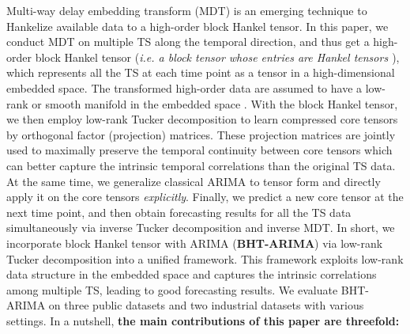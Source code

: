 \documentclass[letterpaper]{article} %
\numberwithin{theorem}{section}
\begin{document}
	
	Multi-way delay embedding transform (MDT)  \cite{yokota2018missing}  is an emerging technique to Hankelize  available data to a high-order block Hankel tensor. In this paper, we conduct MDT on multiple  TS along the temporal direction, and thus get a  high-order block Hankel tensor   (\textit{i.e. a block tensor whose entries are Hankel  tensors \cite{ding2015fast}}),  which represents all the  TS at each time point    as a tensor  in a high-dimensional embedded space. The transformed  high-order data are assumed to have   a low-rank  or  smooth manifold  in the embedded space \cite{yokota2018missing,yokota2018tensor}.
	With the block Hankel tensor, we then employ low-rank Tucker decomposition  to  learn  compressed core tensors by    orthogonal factor (projection) matrices.  These  projection matrices  are jointly used  to maximally preserve the temporal continuity between core tensors which can better capture the intrinsic  temporal correlations than the original TS data. 
	At the same time,  we generalize classical ARIMA to tensor form and directly apply it on the core tensors \textit{explicitly}.  Finally, we predict a new core tensor at the next time point, and then obtain forecasting results for all the TS data simultaneously via inverse Tucker decomposition and  inverse MDT.  In short, we  incorporate block Hankel tensor  with ARIMA (\textbf{BHT-ARIMA}) via low-rank Tucker decomposition into  a unified framework.    This framework  exploits  low-rank data structure in the embedded space and captures the intrinsic correlations among multiple TS, leading to  good forecasting results. 
	We evaluate  BHT-ARIMA on  three public  datasets and two industrial datasets with  various settings. 
	In a nutshell,  \textbf{the main  contributions of this paper are threefold:}
	
\end{document}

